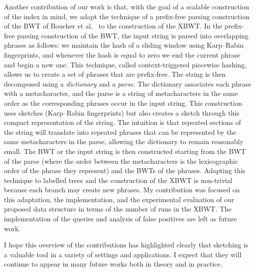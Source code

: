 Another contribution of our work is that, with the goal of a scalable construction of the index in mind, we adapt the technique of a prefix-free parsing construction of the BWT of Boucher et al.~\cite{boucher2019prefix} to the construction of the XBWT. 
In the prefix-free parsing construction of the BWT, the input string is parsed into overlapping phrases as follows: we maintain the hash of a sliding window using Karp--Rabin fingerprints, and whenever the hash is equal to zero we end the current phrase and begin a new one. This technique, called context-triggered piecewise hashing, allows us to create a set of phrases that are prefix-free.
The string is then decomposed using a \emph{dictionary} and a \emph{parse}. 
The dictionary associates each phrase with a metacharacter, and the parse is a string of metacharacters in the same order as the corresponding phrases occur in the input string.
This construction uses sketches (Karp--Rabin fingerprints) but also creates a sketch through this compact representation of the string.
The intuition is that repeated sections of the string will translate into repeated phrases that can be represented by the same metacharacters in the parse, allowing the dictionary to remain reasonably small.
The BWT or the input string is then constructed starting from the BWT of the parse (where the order between the metacharacters is the lexicographic order of the phrase they represent) and the BWTs of the phrases.
Adapting this technique to labelled trees and the construction of the XBWT is non-trivial because each branch may create new phrases. My contribution was focused on this adaptation, the implementation, and the experimental evaluation of our proposed data structure in terms of the number of runs in the XBWT. The implementation of the queries and analysis of false positives are left as future work.


I hope this overview of the contributions has highlighted clearly that sketching is a valuable tool in a variety of settings and applications. I expect that they will continue to appear in many future works both in theory and in practice.